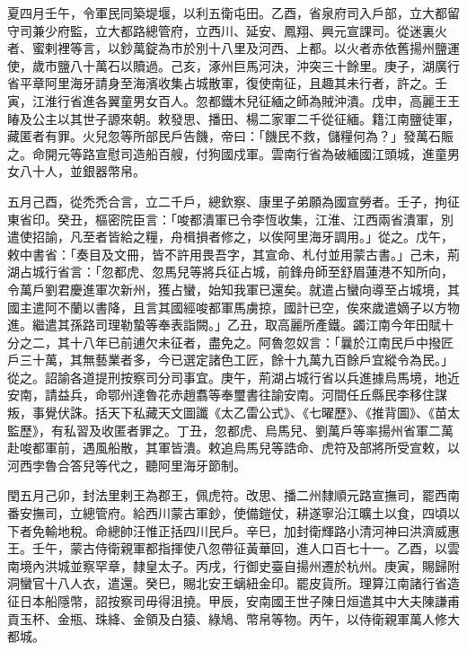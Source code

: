 \begin{pinyinscope}
 夏四月壬午，令軍民同築堤堰，以利五衛屯田。乙酉，省泉府司入戶部，立大都留守司兼少府監，立大都路總管府，立西川、延安、鳳翔、興元宣課司。從迷裏火者、蜜剌裡等言，以鈔萬錠為市於別十八里及河西、上都。以火者赤依舊揚州鹽運使，歲市鹽八十萬石以贖過。己亥，涿州巨馬河決，沖突三十餘里。庚子，湖廣行省平章阿里海牙請身至海濱收集占城散軍，復使南征，且趣其未行者，許之。壬寅，江淮行省進各翼童男女百人。忽都鐵木兒征緬之師為賊沖潰。戊申，高麗王王睶及公主以其世子謜來朝。敕發思、播田、楊二家軍二千從征緬。籍江南鹽徒軍，藏匿者有罪。火兒忽等所部民戶告饑，帝曰：「饑民不救，儲糧何為？」發萬石賑之。命開元等路宣慰司造船百艘，付狗國戍軍。雲南行省為破緬國江頭城，進童男女八十人，並銀器幣帛。



 五月己酉，從禿禿合言，立二千戶，總欽察、康里子弟願為國宣勞者。壬子，拘征東省印。癸丑，樞密院臣言：「唆都潰軍已令李恆收集，江淮、江西兩省潰軍，別遣使招諭，凡至者皆給之糧，舟楫損者修之，以俟阿里海牙調用。」從之。戊午，敕中書省：「奏目及文冊，皆不許用畏吾字，其宣命、札付並用蒙古書。」己未，荊湖占城行省言：「忽都虎、忽馬兒等將兵征占城，前鋒舟師至舒眉蓮港不知所向，令萬戶劉君慶進軍次新州，獲占蠻，始知我軍已還矣。就遣占蠻向導至占城境，其國主遣阿不蘭以書降，且言其國經唆都軍馬虜掠，國計已空，俟來歲遣嫡子以方物進。繼遣其孫路司理勒蟄等奉表詣闕。」乙丑，取高麗所產鐵。蠲江南今年田賦十分之二，其十八年已前逋欠未征者，盡免之。阿魯忽奴言：「曩於江南民戶中撥匠戶三十萬，其無藝業者多，今已選定諸色工匠，餘十九萬九百餘戶宜縱令為民。」從之。詔諭各道提刑按察司分司事宜。庚午，荊湖占城行省以兵進據烏馬境，地近安南，請益兵，命鄂州達魯花赤趙翥等奉璽書往諭安南。河間任丘縣民李移住謀叛，事覺伏誅。括天下私藏天文圖讖《太乙雷公式》、《七曜歷》、《推背圖》、《苗太監歷》，有私習及收匿者罪之。丁丑，忽都虎、烏馬兒、劉萬戶等率揚州省軍二萬赴唆都軍前，遇風船散，其軍皆潰。敕追烏馬兒等誥命、虎符及部將所受宣敕，以河西孛魯合答兒等代之，聽阿里海牙節制。



 閏五月己卯，封法里剌王為郡王，佩虎符。改思、播二州隸順元路宣撫司，罷西南番安撫司，立總管府。給西川蒙古軍鈔，使備鎧仗，耕遂寧沿江曠土以食，四頃以下者免輸地稅。命總帥汪惟正括四川民戶。辛巳，加封衛輝路小清河神曰洪濟威惠王。壬午，蒙古侍衛親軍都指揮使八忽帶征黃華回，進人口百七十一。乙酉，以雲南境內洪城並察罕章，隸皇太子。丙戌，行御史臺自揚州遷於杭州。庚寅，賜歸附洞蠻官十八人衣，遣還。癸巳，賜北安王螭紐金印。罷皮貨所。理算江南諸行省造征日本船隱幣，詔按察司毋得沮撓。甲辰，安南國王世子陳日烜遣其中大夫陳謙甫貢玉杯、金瓶、珠絳、金領及白猿、綠鳩、幣帛等物。丙午，以侍衛親軍萬人修大都城。




\end{pinyinscope}
